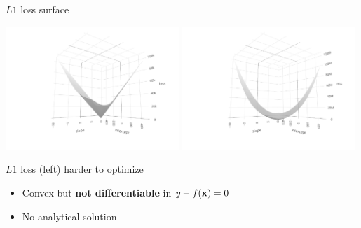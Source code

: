 \documentclass[11pt,compress,t,notes=noshow, xcolor=table]{beamer}
\begin{document}
\begin{vbframe}{$L1$ loss surface}

\includegraphics[width=0.49\textwidth, trim=100 30 100 0, clip]{
figure/reg_l1_surface_abs.pdf}
\includegraphics[width=0.49\textwidth, trim=100 30 100 0, clip]{
figure/reg_l1_surface_quad.pdf}
\vfill

$L1$ loss (left) harder to optimize
\begin{itemize}
    \item Convex but \textbf{not differentiable} in 
    $y - f(\mathbf{x}) = 0$
    \item No analytical solution
\end{itemize}

\end{vbframe}

\end{document}
